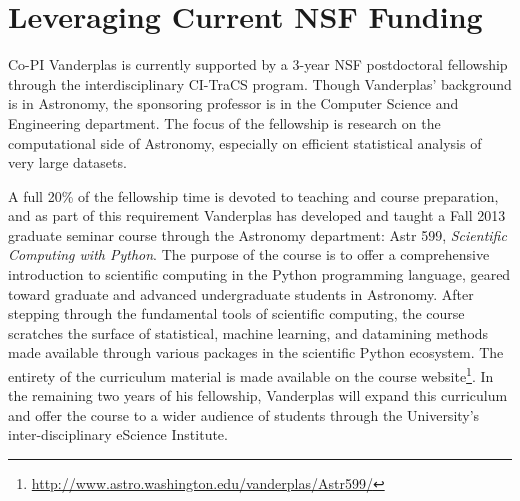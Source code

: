 \section{Leveraging Current NSF Funding}
\label{sec:Jake}

Co-PI Vanderplas is currently supported by a 3-year NSF postdoctoral
fellowship through the interdisciplinary CI-TraCS program.  Though
Vanderplas' background is in Astronomy, the sponsoring professor is in
the Computer Science and Engineering department.  The focus of the
fellowship is research on the computational side of Astronomy, especially
on efficient statistical analysis of very large datasets.

A full 20\% of the fellowship time is devoted to teaching and course
preparation, and as part of this requirement Vanderplas has developed
and taught a Fall 2013
graduate seminar course through the Astronomy department:
Astr 599, {\it Scientific Computing with Python}.  The purpose of the
course is to offer a comprehensive introduction to scientific computing
in the Python programming language, geared toward graduate 
and advanced undergraduate students in Astronomy.
After stepping through the fundamental tools of scientific computing,
the course scratches the surface of statistical, machine learning, and
datamining methods made available through various packages in the scientific
Python ecosystem. The entirety of
the curriculum material is made available on the course website\footnote{
\url{http://www.astro.washington.edu/vanderplas/Astr599/}}.
In the remaining two years of his fellowship, Vanderplas will expand this
curriculum and offer the course to a wider audience of students through
the University's inter-disciplinary eScience Institute.

